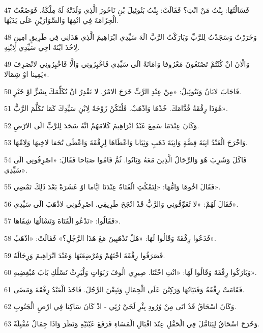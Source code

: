 \par 47 فَسَالْتُهَا: بِنْتُ مَنْ انْتِ؟ فَقَالَتْ: بِنْتُ بَتُوئِيلَ بْنِ نَاحُورَ الَّذِي وَلَدَتْهُ لَهُ مِلْكَةُ. فَوَضَعْتُ الْخِزَامَةَ فِي انْفِهَا وَالسِّوَارَيْنِ عَلَى يَدَيْهَا.
\par 48 وَخَرَرْتُ وَسَجَدْتُ لِلرَّبِّ وَبَارَكْتُ الرَّبَّ الَهَ سَيِّدِي ابْرَاهِيمَ الَّذِي هَدَانِي فِي طَرِيقٍ امِينٍ لِاخُذَ ابْنَةَ اخِي سَيِّدِي لِابْنِهِ.
\par 49 وَالْانَ انْ كُنْتُمْ تَصْنَعُونَ مَعْرُوفا وَامَانَةً الَى سَيِّدِي فَاخْبِرُونِي وَالَّا فَاخْبِرُونِي لانْصَرِفَ يَمِينا اوْ شِمَالا».
\par 50 فَاجَابَ لابَانُ وَبَتُوئِيلُ: «مِنْ عِنْدِ الرَّبِّ خَرَجَ الامْرُ. لا نَقْدِرُ انْ نُكَلِّمَكَ بِشَرٍّ اوْ خَيْرٍ.
\par 51 هُوَذَا رِفْقَةُ قُدَّامَكَ. خُذْهَا وَاذْهَبْ. فَلْتَكُنْ زَوْجَةً لِابْنِ سَيِّدِكَ كَمَا تَكَلَّمَ الرَّبُّ».
\par 52 وَكَانَ عِنْدَمَا سَمِعَ عَبْدُ ابْرَاهِيمَ كَلامَهُمْ انَّهُ سَجَدَ لِلرَّبِّ الَى الارْضِ.
\par 53 وَاخْرَجَ الْعَبْدُ انِيَةَ فِضَّةٍ وَانِيَةَ ذَهَبٍ وَثِيَابا وَاعْطَاهَا لِرِفْقَةَ وَاعْطَى تُحَفا لاخِيهَا وَلِامِّهَا.
\par 54 فَاكَلَ وَشَرِبَ هُوَ وَالرِّجَالُ الَّذِينَ مَعَهُ وَبَاتُوا. ثُمَّ قَامُوا صَبَاحا فَقَالَ: «اصْرِفُونِي الَى سَيِّدِي».
\par 55 فَقَالَ اخُوهَا وَامُّهَا: «لِتَمْكُثِ الْفَتَاةُ عِنْدَنَا ايَّاما اوْ عَشَرَةً بَعْدَ ذَلِكَ تَمْضِي».
\par 56 فَقَالَ لَهُمْ: «لا تُعَوِّقُونِي وَالرَّبُّ قَدْ انْجَحَ طَرِيقِي. اصْرِفُونِي لاذْهَبَ الَى سَيِّدِي».
\par 57 فَقَالُوا: «نَدْعُو الْفَتَاةَ وَنَسْالُهَا شِفَاها».
\par 58 فَدَعُوا رِفْقَةَ وَقَالُوا لَهَا: «هَلْ تَذْهَبِينَ مَعَ هَذَا الرَّجُلِ؟» فَقَالَتْ: «اذْهَبُ».
\par 59 فَصَرَفُوا رِفْقَةَ اخْتَهُمْ وَمُرْضِعَتَهَا وَعَبْدَ ابْرَاهِيمَ وَرِجَالَهُ.
\par 60 وَبَارَكُوا رِفْقَةَ وَقَالُوا لَهَا: «انْتِ اخْتُنَا. صِيرِي الُوفَ رَبَوَاتٍ وَلْيَرِثْ نَسْلُكِ بَابَ مُبْغِضِيهِ».
\par 61 فَقَامَتْ رِفْقَةُ وَفَتَيَاتُهَا وَرَكِبْنَ عَلَى الْجِمَالِ وَتَبِعْنَ الرَّجُلَ. فَاخَذَ الْعَبْدُ رِفْقَةَ وَمَضَى.
\par 62 وَكَانَ اسْحَاقُ قَدْ اتَى مِنْ وُرُودِ بِئْرِ لَحَيْ رُئِي - اذْ كَانَ سَاكِنا فِي ارْضِ الْجَنُوبِ.
\par 63 وَخَرَجَ اسْحَاقُ لِيَتَامَّلَ فِي الْحَقْلِ عِنْدَ اقْبَالِ الْمَسَاءِ فَرَفَعَ عَيْنَيْهِ وَنَظَرَ وَاذَا جِمَالٌ مُقْبِلَةٌ.
